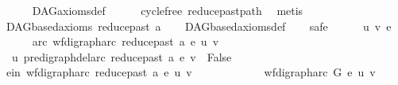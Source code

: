 \begin{isabellebody}
\ \ \ \ \isamarkupfalse%
\ DAG{\isacharunderscore}{\kern0pt}axioms{\isacharunderscore}{\kern0pt}def\isanewline
\ \ \ \ \isamarkupfalse%
\ cycle{\isacharunderscore}{\kern0pt}free\ reduce{\isacharunderscore}{\kern0pt}past{\isacharunderscore}{\kern0pt}path\ \isamarkupfalse%
\ metis\ \isanewline
{}\isamarkupfalse%
\isanewline
\ \ \isamarkupfalse%
\ {\isachardoublequoteopen}DAGbased{\isacharunderscore}{\kern0pt}axioms\ {\isacharparenleft}{\kern0pt}reduce{\isacharunderscore}{\kern0pt}past\ a{\isacharparenright}{\kern0pt}{\isachardoublequoteclose}\isanewline
\ \ \isamarkupfalse%
\ DAGbased{\isacharunderscore}{\kern0pt}axioms{\isacharunderscore}{\kern0pt}def\isanewline
\ \ \isamarkupfalse%
\ safe\isanewline
\ \ \ \ \isamarkupfalse%
\ u\ v\ e\ \isanewline
\ \ \ \ \isamarkupfalse%
\ arc{\isacharcolon}{\kern0pt}\ {\isachardoublequoteopen}wf{\isacharunderscore}{\kern0pt}digraph{\isachardot}{\kern0pt}arc\ {\isacharparenleft}{\kern0pt}reduce{\isacharunderscore}{\kern0pt}past\ a{\isacharparenright}{\kern0pt}\ e\ {\isacharparenleft}{\kern0pt}u{\isacharcomma}{\kern0pt}\ v{\isacharparenright}{\kern0pt}{\isachardoublequoteclose}\isanewline
\ \ \ \ \isamarkupfalse%
\ \isamarkupfalse%
\ {\isachardoublequoteopen}\ u\ {\isasymrightarrow}\isactrlsup {\isacharasterisk}{\kern0pt}\isactrlbsub pre{\isacharunderscore}{\kern0pt}digraph{\isachardot}{\kern0pt}del{\isacharunderscore}{\kern0pt}arc\ {\isacharparenleft}{\kern0pt}reduce{\isacharunderscore}{\kern0pt}past\ a{\isacharparenright}{\kern0pt}\ e\isactrlesub \ v\ {\isasymLongrightarrow}\ False\ {\isachardoublequoteclose}\isanewline
\ \ \ \ \isamarkupfalse%
\ {\isacharminus}{\kern0pt}\isanewline
\ \ \ \ \ \ \ \ \isamarkupfalse%
\ e{\isacharunderscore}{\kern0pt}in{\isacharcolon}{\kern0pt}\ {\isachardoublequoteopen}{\isacharparenleft}{\kern0pt}wf{\isacharunderscore}{\kern0pt}digraph{\isachardot}{\kern0pt}arc\ {\isacharparenleft}{\kern0pt}reduce{\isacharunderscore}{\kern0pt}past\ a{\isacharparenright}{\kern0pt}\ e\ {\isacharparenleft}{\kern0pt}u{\isacharcomma}{\kern0pt}\ v{\isacharparenright}{\kern0pt}{\isacharparenright}{\kern0pt}{\isachardoublequoteclose}\ \isanewline
\ \ \ \ \ \ \ \ \isamarkupfalse%
\ \isamarkupfalse%
\ {\isachardoublequoteopen}{\isacharparenleft}{\kern0pt}wf{\isacharunderscore}{\kern0pt}digraph{\isachardot}{\kern0pt}arc\ G\ e\ {\isacharparenleft}{\kern0pt}u{\isacharcomma}{\kern0pt}\ v{\isacharparenright}{\kern0pt}{\isacharparenright}{\kern0pt}{\isachardoublequoteclose}\isanewline

\end{isabellebody}

